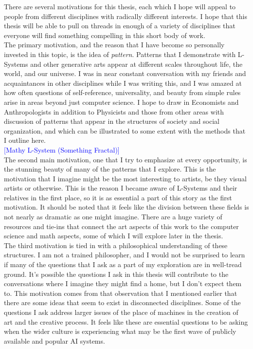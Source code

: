 \documentclass[12pt,twoside]{reedthesis}
\begin{document}
There are several motivations for this thesis, each which I hope will appeal to people from different disciplines with radically different interests. I hope that this thesis will be able to pull on threads in enough of a variety of disciplines that everyone will find something compelling in this short body of work.\\

	The primary motivation, and the reason that I have become so personally invested in this topic, is the idea of \textit{pattern}. Patterns that I demonstrate with L-Systems and other generative arts appear at different scales throughout life, the world, and our universe. I was in near constant conversation with my friends and acquaintances in other disciplines while I was writing this, and I was amazed at how often questions of self-reference, universality, and beauty from simple rules arise in areas beyond just computer science. I hope to draw in Economists and Anthropologists in addition to Physicists and those from other areas with discussion of patterns that appear in the structures of society and social organization, and which can be illustrated to some extent with the methods that I outline here.\\

\textcolor{blue}{[Mathy L-System (Something Fractal)]}\\

	The second main motivation, one that I try to emphasize at every opportunity, is the stunning beauty of many of the patterns that I explore. This is the motivation that I imagine might be the most interesting to artists, be they visual artists or otherwise. This is the reason I became aware of L-Systems and their relatives in the first place, so it is as essential a part of this story as the first motivation. It should be noted that it feels like the division between these fields is not nearly as dramatic as one might imagine. There are a huge variety of resources and tie-ins that connect the art aspects of this work to the computer science and math aspects, some of which I will explore later in the thesis. \\
	
	The third motivation is tied in with a philosophical understanding of these structures. I am not a trained philosopher, and I would not be surprised to learn if many of the questions that I ask as a part of my exploration are in well-tread ground. It’s possible the questions I ask in this thesis will contribute to the conversations where I imagine they might find a home, but I don't expect them to. This motivation comes from that observation that I mentioned earlier that there are some ideas that seem to exist in disconnected disciplines. Some of the questions I ask address larger issues of the place of machines in the creation of art and the creative process. It feels like these are essential questions to be asking when the wider culture is experiencing what may be the first wave of publicly available and popular AI systems.\\
	
\end{document}
